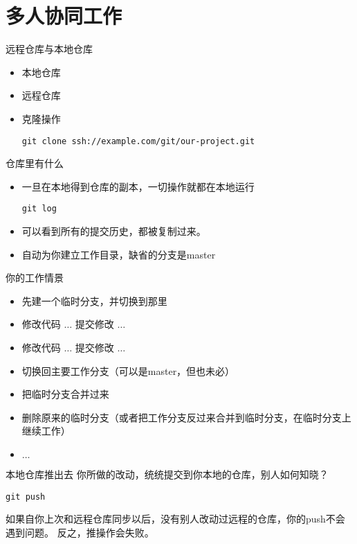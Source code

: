 \part{多人协同工作}
\begin{frame}[<+->][fragile]{远程仓库与本地仓库}
\begin{itemize}
  \item 本地仓库
  \item 远程仓库
  \item 克隆操作
\begin{Verbatim}[frame=single,commandchars=\\\{\}]
git clone ssh://example.com/git/our-project.git
\end{Verbatim}
\end{itemize}
\end{frame}

\begin{frame}[<+->][fragile]{仓库里有什么}
\begin{itemize}
  \item 一旦在本地得到仓库的副本，一切操作就都在本地运行
\begin{Verbatim}[frame=single,commandchars=\\\{\}]
git log
\end{Verbatim}
  \item 可以看到所有的提交历史，都被复制过来。
  \item 自动为你建立工作目录，缺省的分支是master
\end{itemize}
\end{frame}

\begin{frame}[<+->][fragile]{你的工作情景}
    \begin{itemize}
        \item 先建一个临时分支，并切换到那里
        \item 修改代码 \(\ldots\) 提交修改 \(\ldots\)
        \item 修改代码 \(\ldots\) 提交修改 \(\ldots\)
        \item 切换回主要工作分支（可以是master，但也未必）
        \item 把临时分支合并过来
        \item 删除原来的临时分支（或者把工作分支反过来合并到临时分支，在临时分支上继续工作）
        \item \(\ldots\)
    \end{itemize}
\end{frame}

\begin{frame}[<+->][fragile]{本地仓库推出去}
\onslide<+->
你所做的改动，统统提交到你本地的仓库，别人如何知晓？
\begin{Verbatim}[frame=single,commandchars=\\\{\}]
git push
\end{Verbatim}

\onslide<+->
如果自你上次和远程仓库同步以后，没有别人改动过远程的仓库，你的push不会遇到问题。
反之，推操作会失败。
\end{frame}

